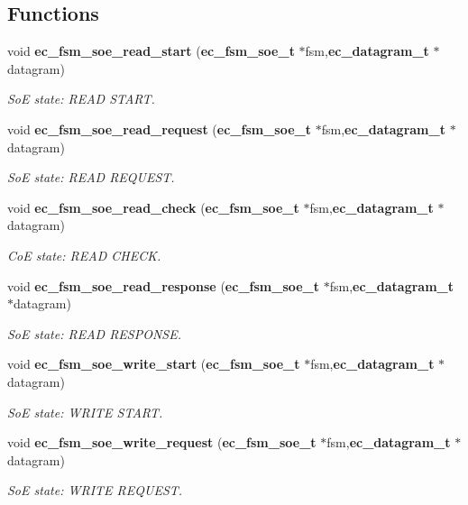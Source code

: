 \subsection*{\-Functions}
\begin{DoxyCompactItemize}
\item 
void {\bf ec\-\_\-fsm\-\_\-soe\-\_\-read\-\_\-start} ({\bf ec\-\_\-fsm\-\_\-soe\-\_\-t} $\ast$fsm,{\bf ec\-\_\-datagram\-\_\-t} $\ast$datagram)
\begin{DoxyCompactList}\small\item\em \-So\-E state\-: \-R\-E\-A\-D \-S\-T\-A\-R\-T. \end{DoxyCompactList}\item 
void {\bf ec\-\_\-fsm\-\_\-soe\-\_\-read\-\_\-request} ({\bf ec\-\_\-fsm\-\_\-soe\-\_\-t} $\ast$fsm,{\bf ec\-\_\-datagram\-\_\-t} $\ast$datagram)
\begin{DoxyCompactList}\small\item\em \-So\-E state\-: \-R\-E\-A\-D \-R\-E\-Q\-U\-E\-S\-T. \end{DoxyCompactList}\item 
void {\bf ec\-\_\-fsm\-\_\-soe\-\_\-read\-\_\-check} ({\bf ec\-\_\-fsm\-\_\-soe\-\_\-t} $\ast$fsm,{\bf ec\-\_\-datagram\-\_\-t} $\ast$datagram)
\begin{DoxyCompactList}\small\item\em \-Co\-E state\-: \-R\-E\-A\-D \-C\-H\-E\-C\-K. \end{DoxyCompactList}\item 
void {\bf ec\-\_\-fsm\-\_\-soe\-\_\-read\-\_\-response} ({\bf ec\-\_\-fsm\-\_\-soe\-\_\-t} $\ast$fsm,{\bf ec\-\_\-datagram\-\_\-t} $\ast$datagram)
\begin{DoxyCompactList}\small\item\em \-So\-E state\-: \-R\-E\-A\-D \-R\-E\-S\-P\-O\-N\-S\-E. \end{DoxyCompactList}\item 
void {\bf ec\-\_\-fsm\-\_\-soe\-\_\-write\-\_\-start} ({\bf ec\-\_\-fsm\-\_\-soe\-\_\-t} $\ast$fsm,{\bf ec\-\_\-datagram\-\_\-t} $\ast$datagram)
\begin{DoxyCompactList}\small\item\em \-So\-E state\-: \-W\-R\-I\-T\-E \-S\-T\-A\-R\-T. \end{DoxyCompactList}\item 
void {\bf ec\-\_\-fsm\-\_\-soe\-\_\-write\-\_\-request} ({\bf ec\-\_\-fsm\-\_\-soe\-\_\-t} $\ast$fsm,{\bf ec\-\_\-datagram\-\_\-t} $\ast$datagram)
\begin{DoxyCompactList}\small\item\em \-So\-E state\-: \-W\-R\-I\-T\-E \-R\-E\-Q\-U\-E\-S\-T. \end{DoxyCompactList}\item 

\end{DoxyCompactItemize}

